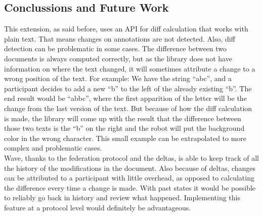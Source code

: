 \subsection{Conclussions and Future Work}
This extension, as said before, uses an API for diff calculation that works with plain text. That means changes on annotations are not detected. Also, diff detection can be problematic in some cases. The difference between two documents is always computed correctly, but as the library does not have information on where the text changed, it will sometimes attribute a change to a wrong position of the text. For example: We have the string ``abc'', and a participant decides to add a new ``b'' to the left of the already existing ``b''. The end result would be ``abbc'', where the first apparition of the letter will be the change from the last version of the text. But because of how the diff calculation is made, the library will come up with the result that the difference between those two texts is the ``b'' on the right and the robot will put the background color in the wrong character. This small example can be extrapolated to more complex and problematic cases.\\[.2cm]
Wave, thanks to the federation protocol and the deltas, is able to keep track of all the history of the modifications in the document. Also because of deltas, changes can be attributed to a participant with little overhead, as opposed to calculating the difference every time a change is made. With past states it would be possible to reliably go back in history and review what happened. Implementing this feature at a protocol level would definitely be advantageous.
